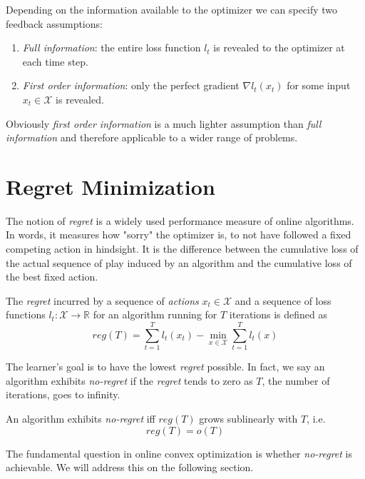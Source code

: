 Depending on the information available to the optimizer we can specify two feedback assumptions:

\begin{enumerate}
    \item \textit{Full information}: the entire loss function $l_t$ is revealed to the optimizer at each time step.
    \item \textit{First order information}: only the perfect gradient $\nabla l_t(x_t)$ for some input $x_t \in \mathcal{X}$ is revealed. 
\end{enumerate}

Obviously \textit{first order information} is a much lighter assumption than \textit{full information} and therefore applicable to a wider range of problems. 


\section{Regret Minimization}\label{section:regretMinimization}

The notion of \textit{regret} is a widely used performance measure of online algorithms. In words, it measures how "sorry" the optimizer is, to not have followed
a fixed competing action in hindsight. It is the difference between the cumulative loss
of the actual sequence of play induced by an algorithm and the cumulative loss of the best fixed action.

\begin{definition}\label{def:regret}
    The \textit{regret} incurred by a sequence of \textit{actions} $x_t \in \mathcal{X}$ and a sequence of loss functions $l_t:\mathcal{X} \to\mathbb{R}$ for an algorithm running for $T$ iterations is defined as
    \[reg(T) = \sum_{t=1}^T l_t(x_t) - \min_{x \in \mathcal{X}} \sum_{t=1}^T l_t(x)\]
\end{definition}

The learner's goal is to have the lowest \textit{regret} possible. In fact, we say an algorithm exhibits \textit{no-regret} if the \textit{regret} tends to zero as $T$, the number of iterations, goes to infinity.

\begin{definition}\label{def:noRegret}
    An algorithm exhibits \textit{no-regret} iff $reg(T)$ grows sublinearly  with $T$, i.e.
    \[reg(T) = o(T)\]
\end{definition}

The fundamental question in online convex optimization is whether \textit{no-regret} is achievable. We will address this on the following section. 

